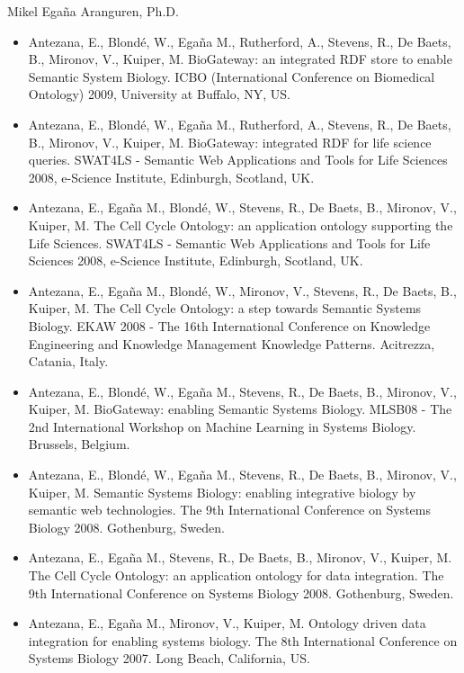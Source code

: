 \documentclass[english,11pt,a4paper,oneside]{article}
\begin{document}
\begin{cv}{Mikel Ega\~na Aranguren, Ph.D. }
\begin{itemize}
\item Antezana, E., Blond\'e, W., Ega\~na M., Rutherford, A., Stevens, R., De Baets, B., Mironov, V., Kuiper, M. BioGateway: an integrated RDF store to enable Semantic System Biology. ICBO (International Conference on Biomedical Ontology) 2009, University at Buffalo, NY, US.

\item Antezana, E., Blond\'e, W., Ega\~na M., Rutherford, A., Stevens, R., De Baets, B., Mironov, V., Kuiper, M. BioGateway: integrated RDF for life science queries. SWAT4LS - Semantic Web Applications and Tools for Life Sciences 2008, e-Science Institute, Edinburgh, Scotland, UK.

\item Antezana, E., Ega\~na M., Blond\'e, W., Stevens, R., De Baets, B., Mironov, V., Kuiper, M. The Cell Cycle Ontology: an application ontology supporting the Life Sciences. SWAT4LS - Semantic Web Applications and Tools for Life Sciences 2008, e-Science Institute, Edinburgh, Scotland, UK.

\item Antezana, E., Ega\~na M., Blond\'e, W., Mironov, V., Stevens, R., De Baets, B., Kuiper, M. The Cell Cycle Ontology: a step towards Semantic Systems Biology. EKAW 2008 - The 16th International Conference on Knowledge Engineering and Knowledge Management Knowledge Patterns. Acitrezza, Catania, Italy.

\item Antezana, E., Blond\'e, W., Ega\~na M., Stevens, R., De Baets, B., Mironov, V., Kuiper, M. BioGateway: enabling Semantic Systems Biology. MLSB08 - The 2nd International Workshop on Machine Learning in Systems Biology. Brussels, Belgium.

\item Antezana, E., Blond\'e, W., Ega\~na M., Stevens, R., De Baets, B., Mironov, V., Kuiper, M. Semantic Systems Biology: enabling integrative biology by semantic web technologies. The 9th International Conference on Systems Biology 2008. Gothenburg, Sweden.

\item Antezana, E., Ega\~na M., Stevens, R., De Baets, B., Mironov, V., Kuiper, M. The Cell Cycle Ontology: an application ontology for data integration. The 9th International Conference on Systems Biology 2008. Gothenburg, Sweden.

\item Antezana, E., Ega\~na M., Mironov, V., Kuiper, M. Ontology driven data integration for enabling systems biology. The 8th International Conference on Systems Biology 2007. Long Beach, California, US.


\end{itemize}
\end{cv}
\end{document}
